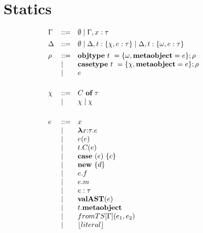 \section{Statics}




\begin{figure}
\centering
\[
\begin{array}{lll} 
\Gamma & \bnfdef & \emptyset \bnfalt \Gamma, x:\tau
\\[1ex]
\Delta & \bnfdef & \emptyset \bnfalt \Delta, t:\{\chi, e:\tau\} \bnfalt \Delta, t:\{\omega, e:\tau\}
\\[1ex]
\rho & \bnfdef & \keyw{objtype}~ t~ = \{ \omega, \keyw{metaobject}=e \}; \rho \\
     & \bnfalt & \keyw{casetype}~ t~ = \{ \chi, \keyw{metaobject}=e \}; \rho\\
     & \bnfalt & e\\
     \\[1ex]
\chi & \bnfdef & C~\keyw{of}~\tau\\
     & \bnfalt & \chi \bnfalt \chi \\
\\[1ex]
e    & \bnfdef & x \\
     & \bnfalt & \boldsymbol\lambda x{:}\tau . e \\ %
     & \bnfalt & e(e) \\
     & \bnfalt & t.C(e) \\
     & \bnfalt & \keyw{case}~(e)~\{ c \} \\
     & \bnfalt & \keyw{new}~ \{ d \}\\
     & \bnfalt & e.f \\
     & \bnfalt & e.m \\
     & \bnfalt & e : \tau\\
     & \bnfalt & \keyw{valAST}(e) \\
     & \bnfalt & t.\keyw{metaobject}\\
     & \bnfalt & fromTS[\Gamma](e_1,e_2)\\
     & \bnfalt & \lfloor literal \rfloor \\
\\[1ex]	 
\end{array}
\begin{array}{lll}
~~~~
\end{array}
\begin{array}{lll}




\end{array}\]
\end{figure}
